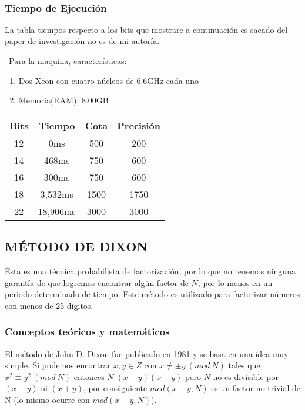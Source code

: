 \documentclass[11pt, conference]{IEEEtran}
\begin{document}
\

\subsubsection[Tiempo de Ejecución]{\textbf{Tiempo de Ejecución}}
La tabla tiempos respecto a los bits que mostrare a continuación es sacado del paper de investigación no es de mi autoría. 
\cite{a}

\
Para la maquina, características:
\begin{enumerate}
	\item Dos Xeon con cuatro núcleos de 6.6GHz cada uno
	\item Memoria(RAM): 8.00GB
\end{enumerate}
\begin{table}[htb]
	\begin{center}
		\begin{tabular}{|c|c|c|c|}
			\hline
			Bits&Tiempo&Cota&Precisión\\
			\hline
			12&0ms&500&200\\
			\hline
			14&468ms&750&600\\
			\hline
			16&300ms&750&600\\
			\hline
			18&3,532ms&1500&1750\\
			\hline
			22&18,906ms&3000&3000\\
			\hline
		\end{tabular}
	\end{center}
\end{table}








\subsection[Método de Dixon]{\textbf{MÉTODO DE DIXON}}
Ésta es una técnica probabilista de factorización, por lo que no tenemos ninguna garantía de que logremos encontrar algún factor de $N$, por lo menos en un periodo determinado de tiempo. Este método es utilizado para factorizar números con menos de 25 dígitos.
\cite{a}\cite{f}

\subsubsection[Conceptos teóricos y matemáticos]{\textbf{Conceptos teóricos y matemáticos}}
El método de John D. Dixon fue publicado en 1981 y se basa en una idea muy simple. Si podemos encontrar $x, y\in Z$ con $x \neq \pm y\ (mod\ N )$ tales que $x^2\equiv y^2\ (mod\ N )$ entonces $N |(x-y)(x+y)$ pero $N$ no es divisible por $(x-y)$ ni $(x+y)$, por consiguiente $mcd(x+y, N )$ es un factor no trivial de N (lo mismo ocurre con $mcd(x - y, N )$).
\end{document}
